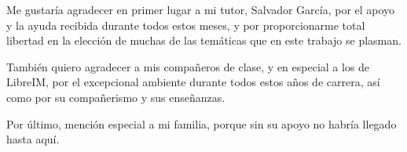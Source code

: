 Me gustaría agradecer en primer lugar a mi tutor, Salvador García, por el apoyo y la ayuda recibida durante
todos estos meses, y por proporcionarme total libertad en la elección de muchas de las temáticas que en 
este trabajo se plasman.

También quiero agradecer a mis compañeros de clase, y en especial a los de LibreIM, por el excepcional ambiente 
durante todos estos años de carrera, así como por su compañerismo y sus enseñanzas.

Por último, mención especial a mi familia, porque sin su apoyo no habría llegado hasta aquí.